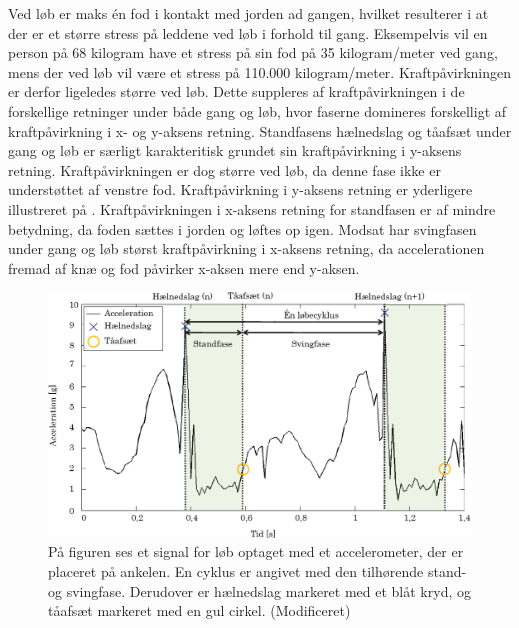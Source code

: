 Ved løb er maks én fod i kontakt med jorden ad gangen, hvilket resulterer i at der er et større stress på leddene ved løb i forhold til gang. Eksempelvis vil en person på 68 kilogram have et stress på sin fod på 35 kilogram/meter ved gang, mens der ved løb vil være et stress på 110.000 kilogram/meter. Kraftpåvirkningen er derfor ligeledes større ved løb. \citep{Adelaar1986} Dette suppleres af kraftpåvirkningen i de forskellige retninger under både gang og løb, hvor faserne domineres forskelligt af kraftpåvirkning i x- og y-aksens retning. \newline 
Standfasens hælnedslag og tåafsæt under gang og løb  er særligt karakteritisk grundet sin kraftpåvirkning i y-aksens retning. Kraftpåvirkningen er dog større ved løb, da denne fase ikke er understøttet af venstre fod. Kraftpåvirkning i y-aksens retning er yderligere illustreret på . Kraftpåvirkningen i x-aksens retning for standfasen er af mindre betydning, da foden sættes i jorden og løftes op igen. Modsat har svingfasen under gang og løb størst kraftpåvirkning i x-aksens retning, da accelerationen fremad af knæ og fod påvirker x-aksen mere end y-aksen. \citep{Rueterbories2010} 
\begin{figure}[H]
	\centering
	\includegraphics[scale=0.55]{figures/bProblemloesning/loeb_skolebog.png}
	\caption{På figuren ses et signal for løb optaget med et accelerometer, der er placeret på ankelen. En cyklus er angivet med den tilhørende stand- og svingfase. Derudover er hælnedslag markeret med et blåt kryd, og tåafsæt markeret med en gul cirkel. \citep{WeyandKelly2001} (Modificeret)}
	\label{fig:loeb_skolebog}
\end{figure}

